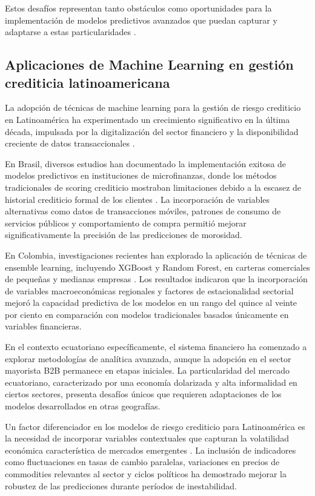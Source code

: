 Estos desafíos representan tanto obstáculos como oportunidades para la implementación de modelos predictivos avanzados que puedan capturar y adaptarse a estas particularidades \cite{torres2023inteligencia}.

\subsection{Aplicaciones de Machine Learning en gestión crediticia latinoamericana}
La adopción de técnicas de machine learning para la gestión de riesgo crediticio en Latinoamérica ha experimentado un crecimiento significativo en la última década, impulsada por la digitalización del sector financiero y la disponibilidad creciente de datos transaccionales \cite{barroso2022machine}.

En Brasil, diversos estudios han documentado la implementación exitosa de modelos predictivos en instituciones de microfinanzas, donde los métodos tradicionales de scoring crediticio mostraban limitaciones debido a la escasez de historial crediticio formal de los clientes \cite{oreski2014genetic}. La incorporación de variables alternativas como datos de transacciones móviles, patrones de consumo de servicios públicos y comportamiento de compra permitió mejorar significativamente la precisión de las predicciones de morosidad.

En Colombia, investigaciones recientes han explorado la aplicación de técnicas de ensemble learning, incluyendo XGBoost y Random Forest, en carteras comerciales de pequeñas y medianas empresas \cite{pena2021credit}. Los resultados indicaron que la incorporación de variables macroeconómicas regionales y factores de estacionalidad sectorial mejoró la capacidad predictiva de los modelos en un rango del quince al veinte por ciento en comparación con modelos tradicionales basados únicamente en variables financieras.

En el contexto ecuatoriano específicamente, el sistema financiero ha comenzado a explorar metodologías de analítica avanzada, aunque la adopción en el sector mayorista B2B permanece en etapas iniciales. La particularidad del mercado ecuatoriano, caracterizado por una economía dolarizada y alta informalidad en ciertos sectores, presenta desafíos únicos que requieren adaptaciones de los modelos desarrollados en otras geografías.

Un factor diferenciador en los modelos de riesgo crediticio para Latinoamérica es la necesidad de incorporar variables contextuales que capturan la volatilidad económica característica de mercados emergentes \cite{barroso2022machine}. La inclusión de indicadores como fluctuaciones en tasas de cambio paralelas, variaciones en precios de commodities relevantes al sector y ciclos políticos ha demostrado mejorar la robustez de las predicciones durante períodos de inestabilidad.

